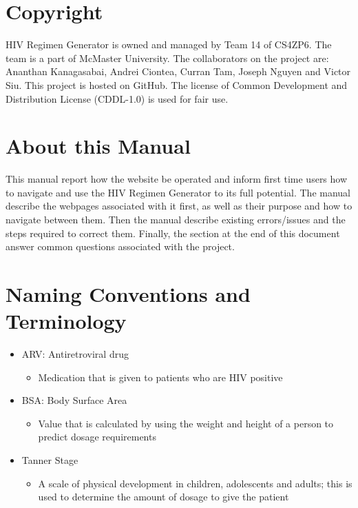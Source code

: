 \documentclass[12pt]{article}
\begin{document}
\section{Copyright}
HIV Regimen Generator is owned and managed by Team 14 of CS4ZP6. The team is a part of McMaster University. The collaborators on the project are: Ananthan Kanagasabai, Andrei Ciontea, Curran Tam, Joseph Nguyen and Victor Siu. This project is hosted on GitHub. The license of Common Development and Distribution License (CDDL-1.0) is used for fair use.

\section{About this Manual}
This manual report how the website be operated and inform first time users how to navigate and use the HIV Regimen Generator to its full potential. The manual describe the webpages associated with it first, as well as their purpose and how to navigate between them. Then the manual describe existing errors/issues and the steps required to correct them. Finally, the section at the end of this document answer common questions associated with the project.

\newpage
\section{Naming Conventions and Terminology}
\begin{itemize}
	\item ARV: Antiretroviral drug
	\begin{itemize}
		\item Medication that is given to patients who are HIV positive
	\end{itemize}
	
	\item BSA: Body Surface Area
	\begin{itemize}
		\item Value that is calculated by using the weight and height of a person to predict dosage requirements
	\end{itemize}

	\item Tanner Stage
	\begin{itemize}
		\item A scale of physical development in children, adolescents and adults; this is used to determine the amount of dosage to give the patient
	\end{itemize}
\end{itemize}
\end{document}
